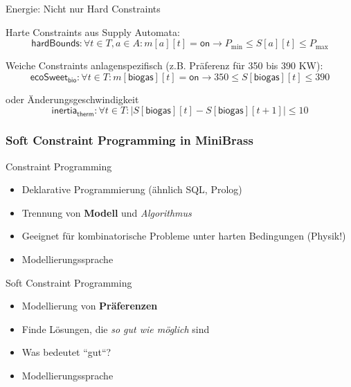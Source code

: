 \begin{frame}{Energie: Nicht nur Hard Constraints}

\alert{Harte} Constraints aus Supply Automata:
\begin{equation}
\mathsf{hardBounds}: \forall t \in T, a \in A : m[a][t] = \mathsf{on} \rightarrow P_{\mathrm{min}} \leq S[a][t] \leq P_{\mathrm{max}} \nonumber
\end{equation}

\pause
\vspace*{2ex}
\alert{Weiche} Constraints anlagenspezifisch (z.B. Präferenz für 350 bis 390 KW):
\begin{equation}
\mathsf{ecoSweet}_{\mathsf{bio}}: \forall t \in T : m[\mathsf{biogas}][t] = \mathsf{on} \rightarrow 350 \leq S[\mathsf{biogas}][t] \leq 390 \nonumber
\end{equation}

\pause
\vspace*{2ex}
oder Änderungsgeschwindigkeit
\begin{equation}
\mathsf{inertia}_{\mathsf{therm}}: \forall t \in T : |S[\mathsf{biogas}][t] - S[\mathsf{biogas}][t+1] | \leq 10 \nonumber
\end{equation}
\end{frame}

\begin{frame}
    \frametitle{Soft Constraint Programming in MiniBrass}
 \alert{Constraint Programming}
    \begin{itemize}
    \item Deklarative Programmierung (ähnlich SQL, Prolog)
    \item Trennung von \textbf{Modell} und \emph{Algorithmus}
    \item Geeignet für kombinatorische Probleme unter harten Bedingungen (Physik!)
    \item Modellierungssprache 
    \end{itemize}

    \vspace*{3ex}
    
\alert{Soft Constraint Programming}
    \begin{itemize} 
    \item Modellierung von \textbf{Präferenzen}
    \item Finde Lösungen, die \emph{so gut wie möglich} sind
    \item Was bedeutet ``gut``?
    \item Modellierungssprache 
     \end{itemize}
\end{frame}



